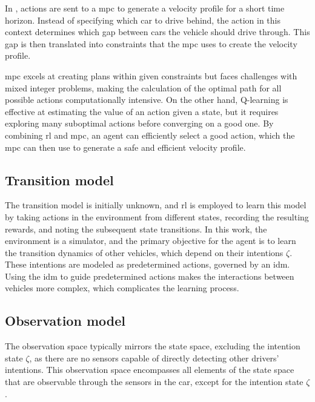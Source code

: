 In \paperMPC, actions are sent to a \gls{mpc} to generate a velocity profile for a short time horizon. Instead of specifying which car to drive behind, the action in this context determines which gap between cars the vehicle should drive through. This gap is then translated into constraints that the \gls{mpc} uses to create the velocity profile.

\gls{mpc} excels at creating plans within given constraints but faces challenges with mixed integer problems, making the calculation of the optimal path for all possible actions computationally intensive. On the other hand, Q-learning is effective at estimating the value of an action given a state, but it requires exploring many suboptimal actions before converging on a good one. By combining \gls{rl} and \gls{mpc}, an agent can efficiently select a good action, which the \gls{mpc} can then use to generate a safe and efficient velocity profile.

\subsection{Transition model}

The transition model is initially unknown, and \gls{rl} is employed to learn this model by taking actions in the environment from different states, recording the resulting rewards, and noting the subsequent state transitions. In this work, the environment is a simulator, and the primary objective for the agent is to learn the transition dynamics of other vehicles, which depend on their intentions $\zeta$. These intentions are modeled as predetermined actions, governed by an \gls{idm}. Using the \gls{idm} to guide predetermined actions makes the interactions between vehicles more complex, which complicates the learning process.


\subsection{Observation model}
The observation space typically mirrors the state space, excluding the intention state $\zeta$, as there are no sensors capable of directly detecting other drivers' intentions. This observation space encompasses all elements of the state space that are observable through the sensors in the car, except for the intention state $\zeta$.

